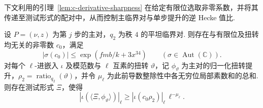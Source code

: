 下文利用的引理~\ref{lem:c-derivative-sharpness} 在给定有限位选取非零系数，并将其传递至测试形式的配对中，从而控制主临界对与单步提升的逆 Hecke 值比.

\begin{lemma}[测试形式与主对提升的有限位配对]
\label{lem:c-test-pairing-lower}
\emitthmsource
设 $P=(\nu,z)$ 为第 $j$ 步的主对，$q_2$ 为秩 $4$ 的平坦临界对. 则存在与有限位及扭转均无关的非零数 $c_0$，满足
\[
 |\sigma(c_0)|\le \exp(fmb/k+3x^{34}) \qquad(\sigma\in\operatorname{Aut}(\mathbb C)).
\]
对每个 $\ell$-进嵌入 $\iota$ 及模范数与 $\ell$ 互素的扭转 $\vartheta$，记 $\phi_\vartheta$ 为主对的归一化扭转提升，$\rho_2=\operatorname{ratio}_{q_2}(\vartheta)$，并令 $\mu_\ell$ 为此前导数整除性中各无穷位局部素数和的总和. 则存在测试形式 $\Xi$，使得
\[
 |\iota(\langle\Xi,\phi_\vartheta\rangle)|_\ell
 \ge |\iota(c_0\rho_2)|_\ell\,\ell^{-\mu_\ell}.
\]
\end{lemma}
